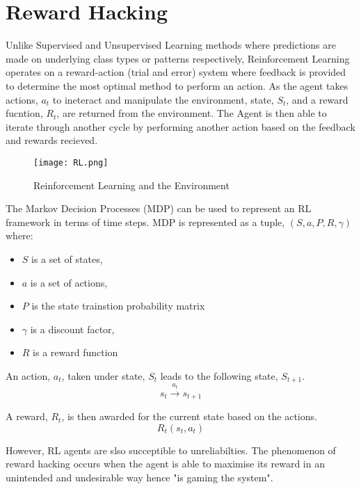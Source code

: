 \chapter{Reward Hacking}
Unlike Supervised and Unsupervised Learning methods where predictions are made on underlying class types or patterns respectively, 
Reinforcement Learning operates on a reward-action (trial and error) system where feedback is provided to determine the most optimal method to perform an action.
As the agent takes actions, $a_t$ to ineteract and manipulate the environment, state, $S_t$, and a reward fucntion, $R_t$, are returned from the environment. 
The Agent is then able to iterate through another cycle by performing another action based on the feedback and rewards recieved.

\begin{figure}[H]
    \centering
    \caption{Reinforcement Learning and the Environment \cite{amiri_mehrpouyan_fridman_mallik_nallanathan_matolak_2018}}
    \texttt{[image: RL.png]}
    \label{fig:RL}
\end{figure}

The Markov Decision Processes (MDP) can be used to represent an RL framework in terms of time steps.
MDP is represented as a tuple, $(S, a, P, R, \gamma)$ where:
\begin{itemize}
    \item $S$ is a set of states,
    \item $a$ is a set of actions,
    \item $P$ is the state trainstion probability matrix
    \item $\gamma$ is a discount factor, 
    \item $R$ is a reward function 
\end{itemize}   

An action, $a_t$, taken under state, $S_t$ leads to the following state, $S_{t+1}$. 
\begin{equation}
    s_t \xrightarrow{a_t} s_{t+1}
\end{equation}

A reward, $R_t$, is then awarded for the current state based on the actions.
\begin{equation}
    R_t(s_t, a_t) 
\end{equation}

However, RL agents are slso succeptible to unreliabilties. The phenomenon of reward hacking occurs when the agent is able to maximise its reward in an unintended and undesirable way hence "is gaming the system".

